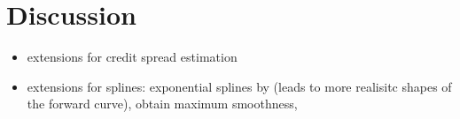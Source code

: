 \newpage
\section{Discussion}

\begin{itemize}
\item extensions for credit spread estimation \cite{Jankowitsch2004, Geyer2004}
\item extensions for splines: exponential splines by \cite{Vasicek1982} (leads to more realisitc shapes of the forward curve), \cite{Adams1994} obtain maximum smoothness, \cite{Fisher1995, Waggoner1997, Anderson1999 }
\end{itemize}